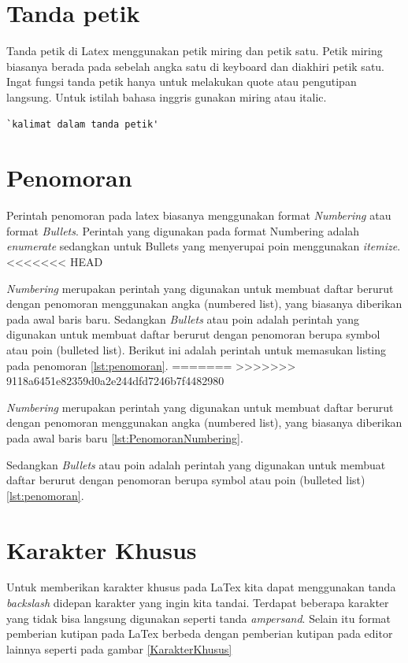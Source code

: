 \section{Tanda petik}
Tanda petik di Latex menggunakan petik miring dan petik satu. Petik miring biasanya berada pada sebelah angka satu di keyboard dan diakhiri petik satu. Ingat fungsi tanda petik hanya untuk melakukan quote atau pengutipan langsung. Untuk istilah bahasa inggris gunakan miring atau italic.

\begin{lstlisting}[caption=Contoh kalimat dalam tanda petik pada Latex,label={lst:tandapetik}]
`kalimat dalam tanda petik'
\end{lstlisting}

\section{Penomoran}
Perintah penomoran pada latex biasanya menggunakan format \textit{Numbering} atau format \textit{Bullets}. Perintah yang digunakan pada format Numbering adalah \textit{enumerate} sedangkan untuk Bullets yang menyerupai poin menggunakan \textit{itemize}.
<<<<<<< HEAD
\par \textit{Numbering} merupakan perintah yang digunakan untuk membuat daftar berurut dengan penomoran menggunakan angka (numbered list), yang biasanya diberikan pada awal baris baru. Sedangkan \textit{Bullets} atau poin adalah perintah yang digunakan untuk membuat daftar berurut dengan penomoran berupa symbol atau poin (bulleted list). Berikut ini adalah perintah untuk memasukan listing pada penomoran \ref{lst:penomoran}.
=======
>>>>>>> 9118a6451e82359d0a2e244dfd7246b7f4482980

\textit{Numbering} merupakan perintah yang digunakan untuk membuat daftar berurut dengan penomoran menggunakan angka (numbered list), yang biasanya diberikan pada awal baris baru \ref{lst:PenomoranNumbering}. 

Sedangkan \textit{Bullets} atau poin adalah perintah yang digunakan untuk membuat daftar berurut dengan penomoran berupa symbol atau poin (bulleted list) \ref{lst:penomoran}.



\section{Karakter Khusus}
Untuk memberikan karakter khusus pada LaTex kita dapat menggunakan tanda \textit{backslash} didepan karakter yang ingin kita tandai. Terdapat beberapa karakter yang tidak bisa langsung digunakan seperti tanda \textit{ampersand}. Selain itu format pemberian kutipan pada LaTex berbeda dengan pemberian kutipan pada editor lainnya seperti pada gambar \ref{KarakterKhusus}


